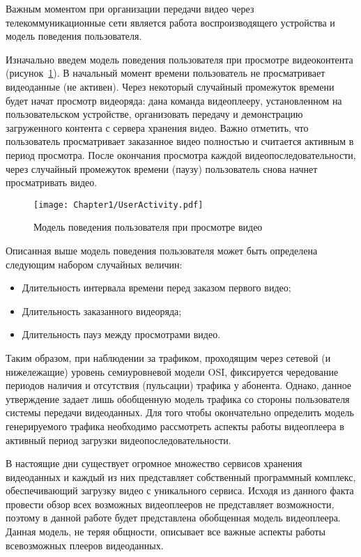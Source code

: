 Важным моментом при организации передачи видео через телекоммуникационные сети является работа воспроизводящего устройства и модель поведения пользователя.

Изначально введем модель поведения пользователя при просмотре видеоконтента (рисунок~\ref{fig:UserActivity}). В начальный момент времени пользователь не просматривает видеоданные (не активен). Через некоторый случайный промежуток времени будет начат просмотр видеоряда: дана команда видеоплееру, установленном на пользовательском устройстве, организовать передачу и демонстрацию загруженного контента с сервера хранения видео. Важно отметить, что пользователь просматривает заказанное видео полностью и считается активным в период просмотра. После окончания просмотра каждой видеопоследовательности, через случайный промежуток времени (паузу) пользователь снова начнет просматривать видео.

\begin{figure}[htbp]
\begin{center}
\texttt{[image: Chapter1/UserActivity.pdf]}
\caption{Модель поведения пользователя при просмотре видео}
\label{fig:UserActivity}
\end{center}
\end{figure}

Описанная выше модель поведения пользователя может быть определена следующим набором случайных величин:
\begin{itemize}
  \item Длительность интервала времени перед заказом первого видео;
  \item Длительность заказанного видеоряда;
  \item Длительность пауз между просмотрами видео.
\end{itemize}

Таким образом, при наблюдении за трафиком, проходящим через сетевой (и нижележащие) уровень семиуровневой модели OSI, фиксируется чередование периодов наличия и отсутствия (пульсации) трафика у абонента. Однако, данное утверждение задает лишь обобщенную модель трафика со стороны пользователя системы передачи видеоданных. Для того чтобы окончательно определить модель генерируемого трафика необходимо рассмотреть аспекты работы видеоплеера в активный период загрузки видеопоследовательности.

В настоящие дни существует огромное множество сервисов хранения видеоданных и каждый из них представляет собственный программный комплекс, обеспечивающий загрузку видео с уникального сервиса. Исходя из данного факта провести обзор всех возможных видеоплееров не представляет возможности, поэтому в данной работе будет представлена обобщенная модель видеоплеера. Данная модель, не теряя общности, описывает все важные аспекты работы всевозможных плееров видеоданных.

